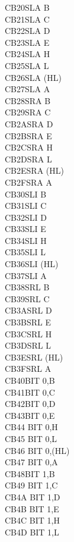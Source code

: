 \documentclass[12pt,twoside,openright,a4paper]{book}
\begin{document}
\begin{multicols}{3}
{\begin{tabbing}
	CB20\>SLA B\\
	CB21\>SLA C\\
	CB22\>SLA D\\
	CB23\>SLA E\\
	CB24\>SLA H\\
	CB25\>SLA L\\
	CB26\>SLA (HL)\\
	CB27\>SLA A\\
	CB28\>SRA B\\
	CB29\>SRA C\\
	CB2A\>SRA D\\
	CB2B\>SRA E\\
	CB2C\>SRA H\\
	CB2D\>SRA L\\
	CB2E\>SRA (HL)\\
	CB2F\>SRA A\\
	CB30\>SLI B\UNDOC\\
	CB31\>SLI C\UNDOC\\
	CB32\>SLI D\UNDOC\\
	CB33\>SLI E\UNDOC\\
	CB34\>SLI H\UNDOC\\
	CB35\>SLI L\UNDOC\\
	CB36\>SLI (HL)\UNDOC\\
	CB37\>SLI A\UNDOC\\
	CB38\>SRL B\\
	CB39\>SRL C\\
	CB3A\>SRL D\\
	CB3B\>SRL E\\
	CB3C\>SRL H\\
	CB3D\>SRL L\\
	CB3E\>SRL (HL)\\
	CB3F\>SRL A\\
	CB40\>BIT 0,B\\
	CB41\>BIT 0,C\\
	CB42\>BIT 0,D\\
	CB43\>BIT 0,E\\
	CB44\> 	BIT 0,H\\
	CB45\> 	BIT 0,L\\
	CB46\> 	BIT 0,(HL)\\
	CB47\> 	BIT 0,A\\
	CB48\>BIT 1,B\\
	CB49\> 	BIT 1,C\\
	CB4A\> 	BIT 1,D\\
	CB4B\> 	BIT 1,E\\
	CB4C\> 	BIT 1,H\\
	CB4D\> 	BIT 1,L\\

\end{tabbing}}
\end{multicols}
\end{document}
